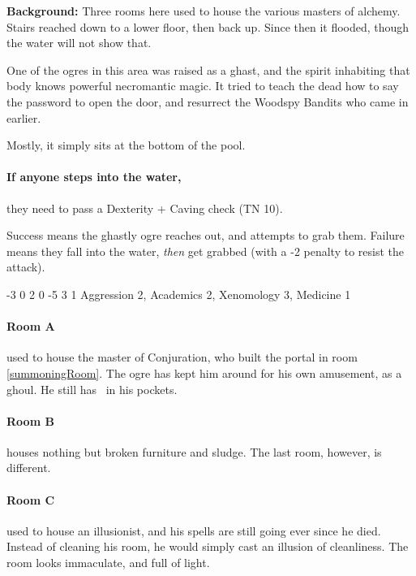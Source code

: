 \textbf{Background:}
Three rooms here used to house the various masters of alchemy.
Stairs reached down to a lower floor, then back up.
Since then it flooded, though the water will not show that.

One of the ogres in this area was raised as a ghast, and the spirit inhabiting that body knows powerful necromantic magic.
It tried to teach the dead how to say the password to open the door, and resurrect the Woodspy Bandits who came in earlier.

Mostly, it simply sits at the bottom of the pool.

\paragraph{If anyone steps into the water,}
they need to pass a Dexterity + Caving check (TN 10).

Success means the ghastly ogre reaches out, and attempts to grab them.
Failure means they fall into the water, \emph{then} get grabbed (with a -2 penalty to resist the attack).

\label{undead_ogre}

  {-3}%
  {0}%
  {{2}%
  {0}%
  {-5}}%
  {3}%
  {1}%
  {
    Aggression 2, Academics 2, Xenomology 3, Medicine 1
  }%
  {\longsword}%
  {
    \addtocounter{xpbonus}{3}
    \setcounter{Fate}{2}
    \setcounter{Air}{2}
    \setcounter{Water}{1}
  }

\paragraph{Room A} used to house the master of Conjuration, who built the portal in room \ref{summoningRoom}.
The ogre has kept him around for his own amusement, as a ghoul.
He still has \lootBig\ in his pockets.

\paragraph{Room B} houses nothing but broken furniture and sludge.
The last room, however, is different.

\paragraph{Room C} used to house an illusionist, and his spells are still going ever since he died.
Instead of cleaning his room, he would simply cast an illusion of cleanliness.
The room looks immaculate, and full of light.

